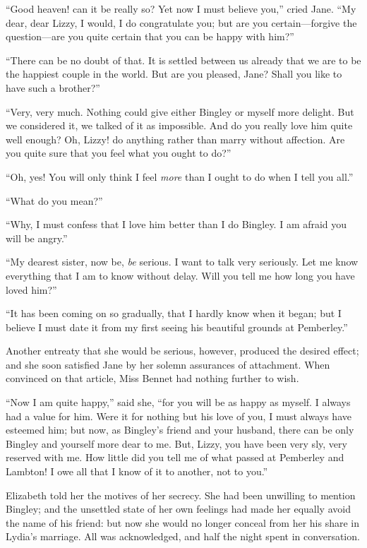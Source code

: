 \documentclass[12pt]{book}
\begin{document}
``Good heaven! can it be really so? Yet now I must believe you,'' cried Jane. ``My dear, dear Lizzy, I would, I do congratulate you; but are you certain---forgive the question---are you quite certain that you can be happy with him?''

``There can be no doubt of that. It is settled between us already that we are to be the happiest couple in the world. But are you pleased, Jane? Shall you like to have such a brother?''

``Very, very much. Nothing could give either Bingley or myself more delight. But we considered it, we talked of it as impossible. And do you really love him quite well enough? Oh, Lizzy! do anything rather than marry without affection. Are you quite sure that you feel what you ought to do?''

``Oh, yes! You will only think I feel \textit{more} than I ought to do when I tell you all.''

``What do you mean?''

``Why, I must confess that I love him better than I do Bingley. I am afraid you will be angry.''

``My dearest sister, now be, \textit{be} serious. I want to talk very seriously. Let me know everything that I am to know without delay. Will you tell me how long you have loved him?''

``It has been coming on so gradually, that I hardly know when it began; but I believe I must date it from my first seeing his beautiful grounds at Pemberley.''

Another entreaty that she would be serious, however, produced the desired effect; and she soon satisfied Jane by her solemn assurances of attachment. When convinced on that article, Miss Bennet had nothing further to wish.

``Now I am quite happy,'' said she, ``for you will be as happy as myself. I always had a value for him. Were it for nothing but his love of you, I must always have esteemed him; but now, as Bingley's friend and your husband, there can be only Bingley and yourself more dear to me. But, Lizzy, you have been very sly, very reserved with me. How little did you tell me of what passed at Pemberley and Lambton! I owe all that I know of it to another, not to you.''

Elizabeth told her the motives of her secrecy. She had been unwilling to mention Bingley; and the unsettled state of her own feelings had made her equally avoid the name of his friend: but now she would no longer conceal from her his share in Lydia's marriage. All was acknowledged, and half the night spent in conversation.
\end{document}
